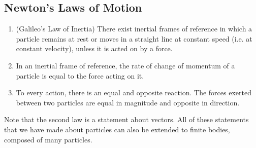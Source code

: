 \documentclass{article}
\begin{document}
\subsection{Newton's Laws of Motion}
\begin{enumerate}
    \item (Galileo's Law of Inertia) There exist inertial frames of reference in which a particle remains at rest or moves in a straight line at constant speed (i.e. at constant velocity), unless it is acted on by a force.
    \item In an inertial frame of reference, the rate of change of momentum of a particle is equal to the force acting on it.
    \item To every action, there is an equal and opposite reaction. The forces exerted between two particles are equal in magnitude and opposite in direction.
\end{enumerate}
Note that the second law is a statement about vectors. All of these statements that we have made about particles can also be extended to finite bodies, composed of many particles.
\end{document}

